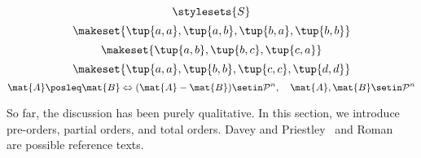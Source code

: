 {\begin{forslides}
\begin{equation}
            \label{eq:pow_7}
            \stylesets{S}
        \end{equation}
        \begin{equation}
            \label{eq:pre_ex1}
            \makeset{\tup{a,a}, \tup{a,b}, \tup{b,a}, \tup{b,b}}
        \end{equation}
        \begin{equation}
            \label{eq:pre_ex2}
            \makeset{\tup{a,b}, \tup{b,c}, \tup{c,a}}
        \end{equation}
        \begin{equation}
            \label{eq:pre_ex3}
            \makeset{\tup{a,a}, \tup{b,b}, \tup{c,c}, \tup{d,d}}
        \end{equation}
        \begin{equation}
            \label{eq:posdef_1}
            \mat{A}\posleq \mat{B} \Leftrightarrow (\mat{A}-\mat{B})\setin \mathcal{P}^n, \quad \mat{A},\mat{B}\setin \mathcal{P}^n
        \end{equation}
    \end{forslides}
}

%


So far, the discussion has been purely qualitative.
In this section, we introduce pre-orders, partial orders, and total orders.
Davey and Priestley~\cite{davey02} and Roman~\cite{roman08} are possible reference texts.

